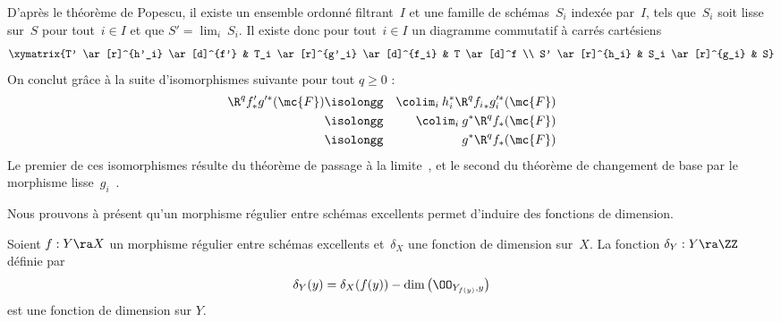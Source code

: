 \documentclass[10pt]{../fichiers-configuration-latex/smfart}
\begin{document}
\begin{démo} D'après le théorème de Popescu, il existe un ensemble ordonné filtrant~$I$ et une
famille de schémas~$S_i$ indexée par~$I$, tels que~$S_i$ soit lisse sur~$S$ pour tout~$i\in I$ et
que $S' = \lim_i \: S_i$. Il existe donc pour tout~$i\in I$ un diagramme commutatif à carrés
cartésiens $$\xymatrix{T' \ar[r]^{h'_i} \ar[d]^{f'} & T_i \ar[r]^{g'_i} \ar[d]^{f_i} & T \ar[d]^f \\
S' \ar[r]^{h_i} & S_i \ar[r]^{g_i} & S}$$ On conclut grâce à la suite d'isomorphismes suivante pour
tout $q\geq 0$ : \begin{eqnarray*} \R^q f'_*  g'^*  (\mc{F})  & \isolongg & {\colim}_{i} \: h_i^*
\R^q {f_i}_*  g_i'^* (\mc{F}) \\ & \isolongg &  {\colim}_{i} \: g^*  \R^q f_* (\mc{F}) \\ &
\isolongg & g^*  \R^q f_* (\mc{F}) \end{eqnarray*} Le premier de ces isomorphismes résulte du
théorème de passage à la limite~, et le second du théorème de changement de base
par le morphisme lisse~$g_i$~.  \end{démo}

Nous prouvons à présent qu'un morphisme régulier entre schémas excellents permet d'induire des
fonctions de dimension.

\begin{proposition2} \label{14-prop-fonction-dim-induite-regulier} Soient $f : Y \ra X$ un morphisme
régulier entre schémas excellents et~$\delta_X$ une fonction de dimension sur~$X$. La fonction
$\delta_Y : Y \ra \ZZ$ définie par $$\delta_Y(y) =  \delta_X(f(y))  - \dim \left( \OO_{Y_{f(y)},y}
\right) $$ est une fonction de dimension sur $Y$.  \end{proposition2}
\end{document}
